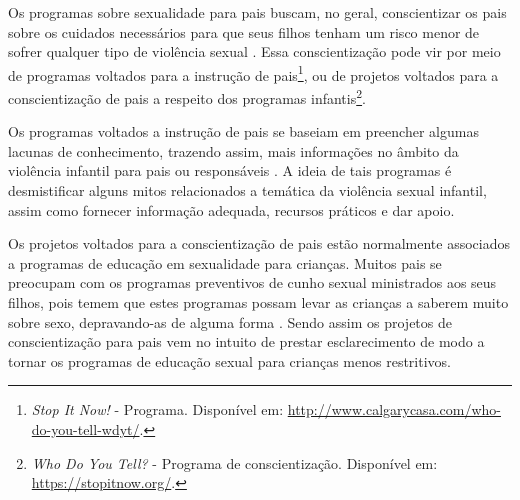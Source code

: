 Os programas sobre sexualidade para pais buscam, no geral, conscientizar os pais sobre os cuidados necessários para que seus filhos tenham um risco menor de sofrer qualquer tipo de violência sexual \cite{pelisoli2010prevenccao}. Essa conscientização pode vir por meio de programas voltados para a instrução de pais\footnote{\textit{\label{note:nota2}Stop It Now!} - Programa. Disponível em: \url{http://www.calgarycasa.com/who-do-you-tell-wdyt/}.}, ou de projetos voltados para a conscientização de pais a respeito dos programas infantis\footnote{\textit{\label{note:nota3}Who Do You Tell?} - Programa de conscientização. Disponível em: \url{https://stopitnow.org/}.}. 

Os programas voltados a instrução de pais se baseiam em preencher algumas lacunas de conhecimento, trazendo assim, mais informações no âmbito da violência infantil para pais ou responsáveis \cite{maria2010papel}. A ideia de tais programas é desmistificar alguns mitos relacionados a temática da violência sexual infantil, assim como fornecer informação adequada, recursos práticos e dar apoio.

Os projetos voltados para a conscientização de pais estão normalmente associados a programas de educação em sexualidade para crianças. Muitos pais se preocupam com os programas preventivos de cunho sexual ministrados aos seus filhos, pois temem que estes programas possam levar as crianças a saberem muito sobre sexo, depravando-as de alguma forma \cite{chen2007prevention}. Sendo assim os projetos de conscientização para pais vem no intuito de prestar esclarecimento de modo a tornar os programas de educação sexual para crianças menos restritivos. 





